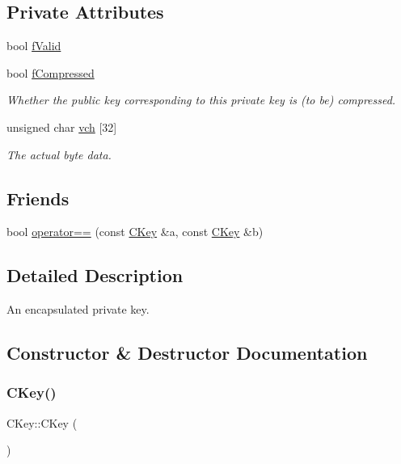 \subsection*{Private Attributes}
\begin{DoxyCompactItemize}
\item 
bool \mbox{\hyperlink{class_c_key_a78cdd7f831519b5167f6c801f49fa977}{f\+Valid}}
\item 
bool \mbox{\hyperlink{class_c_key_a9e5f8cac8811466c735d7af6f17a0dfe}{f\+Compressed}}
\begin{DoxyCompactList}\small\item\em Whether the public key corresponding to this private key is (to be) compressed. \end{DoxyCompactList}\item 
unsigned char \mbox{\hyperlink{class_c_key_a07f9e2b043670dfbaa9b7b4e782ed116}{vch}} \mbox{[}32\mbox{]}
\begin{DoxyCompactList}\small\item\em The actual byte data. \end{DoxyCompactList}\end{DoxyCompactItemize}
\subsection*{Friends}
\begin{DoxyCompactItemize}
\item 
bool \mbox{\hyperlink{class_c_key_a381efd9184dc467e73e690329c70371d}{operator==}} (const \mbox{\hyperlink{class_c_key}{C\+Key}} \&a, const \mbox{\hyperlink{class_c_key}{C\+Key}} \&b)
\end{DoxyCompactItemize}


\subsection{Detailed Description}
An encapsulated private key. 

\subsection{Constructor \& Destructor Documentation}
\mbox{\label{class_c_key_a8f4ca910c7b7e729a3f2a5c59d060d3d}} 
\subsubsection{\texorpdfstring{C\+Key()}{CKey()}\hspace{0.1cm}{\footnotesize\ttfamily [1/2]}}
{\footnotesize\ttfamily C\+Key\+::\+C\+Key (\begin{DoxyParamCaption}{ }\end{DoxyParamCaption})\hspace{0.3cm}{\ttfamily [inline]}}



